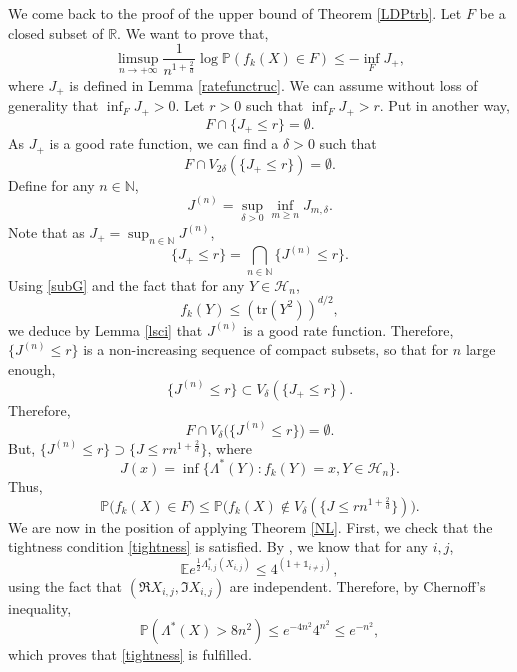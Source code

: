 \documentclass[aop,preprint]{imsart}
\newcommand\NN{\mathbb{N}}
\newcommand\RR{\mathbb{R}}
\newcommand\PP{\mathbb{P}}
\newcommand\EE{\mathbb{E}}
\newcommand\tr{\mathrm{tr}}
\newcommand\Car{\mathds{1}}
\numberwithin{equation}{section}
\theoremstyle{definition}
\theoremstyle{plain}
\theoremstyle{remark}
\begin{document}
We come back to the proof of the upper bound of Theorem \ref{LDPtrb}. Let $F$ be a closed subset of $\RR$. We want to prove that,
$$ \limsup_{n\to +\infty} \frac{1}{n^{1+\frac{2}{d}}} \log \PP( f_k(X) \in F) \leq - \inf_F J_+,$$
where $J_+$ is defined in Lemma \ref{ratefunctruc}.
We can assume without loss of generality that $\inf_F J_+>0$. Let $r>0$ such that $\inf_F J_+>r$. Put in another way,
$$F\cap \{ J_+\leq r\} = \emptyset.$$
As $J_+$ is a good rate function, we can find a $\delta>0$ such that 
$$ F \cap V_{2\delta}(\{J_+ \leq r\}) = \emptyset.$$ Define for any $n\in \NN$,
$$ J^{(n)} = \sup_{\delta>0} \inf_{m\geq n } J_{m,\delta}.$$ 
Note that as $J_+ = \sup_{n\in \NN} J^{(n)}$,
$$\{ J_+ \leq r\} = \bigcap_{n\in \NN} \{ J^{(n)} \leq r \}.$$
Using \eqref{subG} and the fact that for any $Y\in \mathcal{H}_n$,
$$ f_k(Y) \leq (\tr (Y^2))^{d/2},$$
we deduce by Lemma \ref{lsci} that $J^{(n)}$ is a good rate function.
 Therefore, $\{ J^{(n)} \leq r\}$ is a non-increasing sequence of compact subsets, so that for $n$ large enough,  
$$\{ J^{(n)} \leq r \} \subset V_{\delta}( \{ J_+ \leq r \}).$$
Therefore, 
$$ F \cap V_{\delta}\big( \{ J^{(n)} \leq r \}\big) =\emptyset.$$
But, $\{ J^{(n)} \leq r \} \supset \{ J \leq rn^{1+\frac{2}{d}} \}$, where
$$ J(x) = \inf \big\{ \Lambda^*(Y) :f_k(Y) = x , Y \in\mathcal{H}_n\big\}.$$ 
Thus,
\begin{equation} \label{reductionup} \PP\big( f_k(X) \in F\big) \leq \PP\big( f_k(X) \notin V_{\delta}( \{ J \leq rn^{1+\frac{2}{d}} \}) \big).\end{equation}
We are now in the position of applying Theorem \ref{NL}. First, we check that the tightness condition \eqref{tightness} is satisfied. By  \cite[Lemma 5.1.14]{DZ}, we know that for any $i,j$,
$$\EE e^{\frac{1}{2} \Lambda_{i,j}^* (X_{i,j}) } \leq 4^{(1+\Car_ {i \neq j})},$$
using the fact that $(\Re X_{i,j}, \Im X_{i,j})$ are independent. Therefore, by Chernoff's inequality,
$$ \PP( \Lambda^*(X)> 8n^2)\leq  e^{-4n^2} 4^{n^2} \leq e^{-n^2},$$
which proves that \eqref{tightness} is fulfilled.
\end{document}
